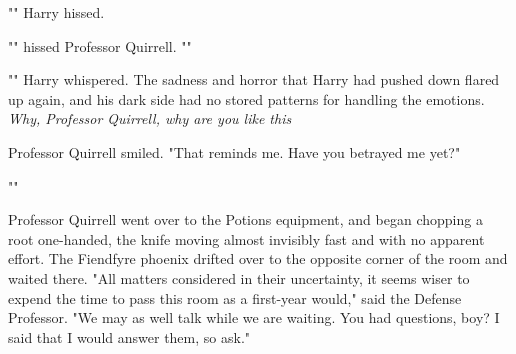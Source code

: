 "" Harry hissed.

"" hissed Professor Quirrell.
""

"" Harry whispered. The sadness and horror that Harry had pushed
down flared up again, and his dark side had no stored patterns for handling the
emotions. \emph{Why, Professor Quirrell, why are you like this{\el}}

Professor Quirrell smiled. "That reminds me. Have you betrayed me yet?"

""

Professor Quirrell went over to the Potions equipment, and began chopping a
root one-handed, the knife moving almost invisibly fast and with no apparent
effort. The Fiendfyre phoenix drifted over to the opposite corner of the room
and waited there. "All matters considered in their uncertainty, it seems wiser
to expend the time to pass this room as a first-year would," said the Defense
Professor. "We may as well talk while we are waiting. You had questions, boy? I
said that I would answer them, so ask."
